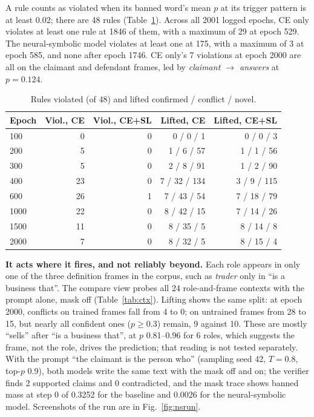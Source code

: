 \documentclass[letterpaper, 10pt, conference]{IEEEtran}
\begin{document}
A rule counts as violated when its banned word's mean $p$ at its trigger pattern is at least 0.02; there are 48 rules (Table~\ref{tab:viol}). Across all 2001 logged epochs, CE only violates at least one rule at 1846 of them, with a maximum of 29 at epoch 529. The neural-symbolic model violates at least one at 175, with a maximum of 3 at epoch 585, and none after epoch 1746. CE only's 7 violations at epoch 2000 are all on the claimant and defendant frames, led by \emph{claimant $\to$ answers} at $p{=}0.124$.

\begin{table}[t]
\caption{Rules violated (of 48) and lifted confirmed / conflict / novel.}\label{tab:viol}
\centering\footnotesize\setlength{\tabcolsep}{3pt}
\begin{tabular}{@{}lrrrr@{}}
\toprule
Epoch & Viol., CE & Viol., CE+SL & Lifted, CE & Lifted, CE+SL\\
\midrule
100 & 0 & 0 & 0 / 0 / 1 & 0 / 0 / 3\\
200 & 5 & 0 & 1 / 6 / 57 & 1 / 1 / 56\\
300 & 5 & 0 & 2 / 8 / 91 & 1 / 2 / 90\\
400 & 23 & 0 & 7 / 32 / 134 & 3 / 9 / 115\\
600 & 26 & 1 & 7 / 43 / 54 & 7 / 18 / 79\\
1000 & 22 & 0 & 8 / 42 / 15 & 7 / 14 / 26\\
1500 & 11 & 0 & 8 / 35 / 5 & 8 / 14 / 8\\
2000 & 7 & 0 & 8 / 32 / 5 & 8 / 15 / 4\\
\bottomrule
\end{tabular}
\end{table}

\textbf{It acts where it fires, and not reliably beyond.} Each role appears in only one of the three definition frames in the corpus, such as \emph{trader} only in ``is a business that''. The compare view probes all 24 role-and-frame contexts with the prompt alone, mask off (Table~\ref{tab:ctx}). Lifting shows the same split: at epoch 2000, conflicts on trained frames fall from 4 to 0; on untrained frames from 28 to 15, but nearly all confident ones ($p\ge0.3$) remain, 9 against 10. These are mostly ``sells'' after ``is a business that'', at $p$ 0.81--0.96 for 6 roles, which suggests the frame, not the role, drives the prediction; that reading is not tested separately. With the prompt ``the claimant is the person who'' (sampling seed 42, $T{=}0.8$, top-$p$ 0.9), both models write the same text with the mask off and on; the verifier finds 2 supported claims and 0 contradicted, and the mask trace shows banned mass at step 0 of 0.3252 for the baseline and 0.0026 for the neural-symbolic model. Screenshots of the run are in Fig.~\ref{fig:nsrun}.
\end{document}
